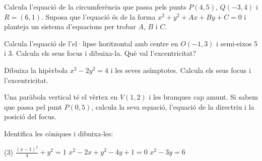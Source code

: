 \begin{autoaval}{22}

\begin{mylist}
	\exer[2]  Calcula l'equació de la circumferència que passa pels punts $P(4,5)$, $Q(-3,4)$ i $R=(6,1)$. Suposa que l'equació és de la forma $x^2+y^2+Ax+By+C=0$ i planteja un sistema d'equacions per trobar $A$, $B$ i $C$.
	
	\exer[2] Calcula l'equació de l'el·lipse horitzontal amb centre en $O(-1,3)$ i semi-eixos 5 i 3. Calcula els seus focus i dibuixa-la. Què val l'excentricitat?
		
	\exer[2] Dibuixa la hipèrbola $x^2-2y^2=4$ i les seves asímptotes. Calcula els seus focus i l'excentricitat.
	
	\exer[2] Una paràbola vertical té el vèrtex en $V(1,2)$ i les branques cap amunt. Si sabem que passa pel punt $P(0,5)$, calcula la seva equació, l'equació de la directriu i la posició del focus.
	
	\exer[2] Identifica les còniques i dibuixa-les:
	  \begin{tasks}(3)
	  		\task $\frac{(x-1)^2}{4}+y^2=1$	
	  		\task $x^2-2x+y^2-4y+1=0$
	  		\task $x^2-3y=6$
	  \end{tasks}
\end{mylist}
\end{autoaval}